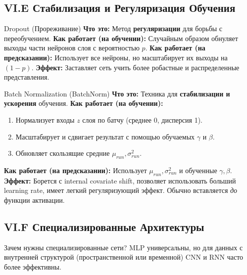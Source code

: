 \subsection{VI.E Стабилизация и Регуляризация Обучения}

\begin{myexampleblock}{Dropout (Прореживание)}
    \textbf{Что это:} Метод \textbf{регуляризации} для борьбы с переобучением.
    \textbf{Как работает (на обучении):} Случайным образом обнуляет выходы части нейронов слоя с вероятностью $p$.
    \textbf{Как работает (на предсказании):} Использует все нейроны, но масштабирует их выходы на $(1-p)$.
    \textbf{Эффект:} Заставляет сеть учить более робастные и распределенные представления.
\end{myexampleblock}

\begin{myexampleblock}{Batch Normalization (BatchNorm)}
    \textbf{Что это:} Техника для \textbf{стабилизации и ускорения} обучения.
    \textbf{Как работает (на обучении):}
    \begin{enumerate}
        \item Нормализует входы $z$ слоя по батчу (среднее 0, дисперсия 1).
        \item Масштабирует и сдвигает результат с помощью обучаемых $\gamma$ и $\beta$.
        \item Обновляет скользящие средние $\mu_{run}, \sigma^2_{run}$.
    \end{enumerate}
    \textbf{Как работает (на предсказании):} Использует $\mu_{run}, \sigma^2_{run}$ и обученные $\gamma, \beta$.
    \textbf{Эффект:} Борется с internal covariate shift, позволяет использовать больший learning rate, имеет легкий регуляризующий эффект. Обычно вставляется \textit{до} функции активации.
\end{myexampleblock}

\subsection{VI.F Специализированные Архитектуры}

\begin{textbox}{Зачем нужны специализированные сети?}
    MLP универсальны, но для данных с внутренней структурой (пространственной или временной) CNN и RNN часто более эффективны.
\end{textbox}

